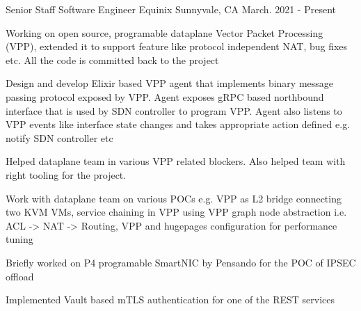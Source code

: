 

\begin{cventries}

  \cventry
    {Senior Staff Software Engineer} %
    {Equinix} %
    {Sunnyvale, CA} %
    {March. 2021 - Present} %
    {
      \begin{cvitems} %
        \item {Working on open source, programable dataplane Vector Packet Processing (VPP), extended it to support feature like protocol independent NAT, bug fixes etc.
               All the code is committed back to the project}
        \item {Design and develop Elixir based VPP agent that implements binary message passing protocol exposed by VPP.
               Agent exposes gRPC based northbound interface that is used by SDN controller to program VPP. Agent also listens to VPP events like interface state changes and
               takes appropriate action defined e.g. notify SDN controller etc}
        \item {Helped dataplane team in various VPP related blockers. Also helped team with right tooling for the project.}
        \item {Work with dataplane team on various POCs e.g. VPP as L2 bridge connecting two KVM VMs, service chaining in VPP using VPP graph node abstraction i.e. ACL -> NAT -> Routing,
               VPP and hugepages configuration for performance tuning}
        \item {Briefly worked on P4 programable SmartNIC by Pensando for the POC of IPSEC offload}
        \item {Implemented Vault based mTLS authentication for one of the REST services}
      \end{cvitems}
    }


\end{cventries}
